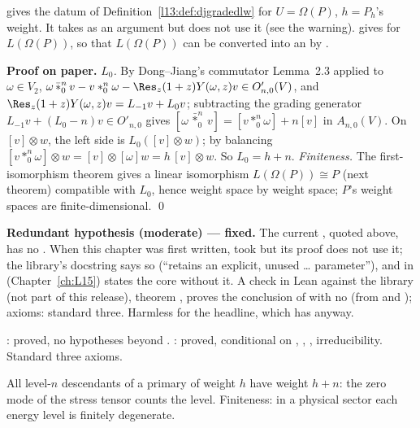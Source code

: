 \begin{dictionary}
 gives the datum  of Definition~\ref{l13:def:djgradedlw} for $U = \Omega(P)$, $h = P_h$'s weight. It takes
 as an argument but does not use it (see the warning).  gives  for
$L(\Omega(P))$, so that $L(\Omega(P))$ can be converted into an  by .
\end{dictionary}

\textbf{Proof on paper.} \emph{$L_0$.} By Dong--Jiang's commutator Lemma~2.3 applied to $\omega\in V_2$,
$\omega\,\bar*^n_0\,v - v*^n_0\omega - \Res_z(1+z)Y(\omega,z)v\in O'_{n,0}(V)$, and $\Res_z(1+z)Y(\omega,z)v = L_{-1}v+L_0v$; subtracting
the grading generator $L_{-1}v+(L_0-n)v\in O'_{n,0}$ gives $[\omega\,\bar*^n_0\,v] = [v*^n_0\omega]+n[v]$ in $A_{n,0}(V)$. On
$[v]\otimes w$, the left side is $L_0([v]\otimes w)$; by balancing $[v*^n_0\omega]\otimes w = [v]\otimes[\omega]w = h\,[v]\otimes w$.
So $L_0 = h+n$. \emph{Finiteness.} The first-isomorphism theorem gives a linear isomorphism $L(\Omega(P))\cong P$ (next theorem)
compatible with $L_0$, hence weight space by weight space; $P$'s weight spaces are finite-dimensional. \qed

\begin{warning}
\textbf{Redundant hypothesis (moderate) --- fixed.} The current , quoted above, has no . When this chapter
was first written,  took  but
its proof does not use it; the library's docstring says so (``retains an explicit, unused \ldots{} parameter''), and
 in  (Chapter~\ref{ch:L15}) states the core without it.
A check in Lean against the library (not part of this release), theorem , proves the conclusion of  with no 
(from  and ); axioms: standard three. Harmless for the headline, which has 
anyway.
\end{warning}

\begin{status}
: proved, no hypotheses beyond . : proved, conditional on , , ,
irreducibility. Standard three axioms.
\end{status}

\begin{physics}
All level-$n$ descendants of a primary of weight $h$ have weight $h+n$: the zero mode of the stress tensor counts the level.
Finiteness: in a physical sector each energy level is finitely degenerate.
\end{physics}

